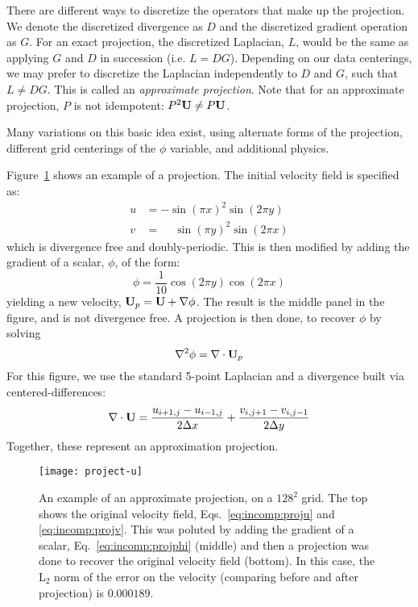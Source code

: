 There are different ways to discretize the operators that make up the
projection.  We denote the discretized divergence as $D$ and the
discretized gradient operation as $G$.  For an exact projection, the
discretized Laplacian, $L$, would be the same as applying $G$ and $D$
in succession (i.e. $L = DG$).  Depending on our data centerings, we
may prefer to discretize the Laplacian independently to $D$ and $G$,
such that $L \ne DG$.  This is called an {\em approximate projection}.
Note that for an approximate projection, $P$ is not
idempotent: $P^2 {\bf U} \ne P{\bf U}$.

Many variations on this basic idea exist, using alternate forms of the
projection, different grid centerings of the $\phi$ variable, and
additional physics.

Figure~\ref{fig:incomp:project} shows an example of a projection.  The
initial velocity field is specified as:
\begin{align}
\label{eq:incomp:proju}
  u &= -\sin(\pi x)^2 \sin(2\pi y) \\
\label{eq:incomp:projv}
  v &= \phantom{+} \sin(\pi y)^2 \sin(2\pi x)
\end{align}
which is divergence free and doubly-periodic.  This is then modified
by adding the gradient of a scalar, $\phi$, of the form:
\begin{equation}
\label{eq:incomp:projphi}
\phi = \frac{1}{10} \cos(2\pi y) \cos(2\pi x) 
\end{equation}
yielding a new velocity, ${\bf U}_p = {\bf U} + \nabla \phi$.
The result is the middle panel in the figure, and is not divergence free.
A projection is then done, to recover $\phi$ by solving
\begin{equation}
\nabla^2 \phi = \nabla \cdot {\bf U}_p
\end{equation}
For this figure, we use the standard 5-point Laplacian and a divergence
built via centered-differences:
\begin{equation}
\nabla \cdot {\bf U} = \frac{u_{i+1,j} - u_{i-1,j}}{2\Delta x} + \frac{v_{i,j+1} - v_{i,j-1}}{2\Delta y}
\end{equation}
Together, these represent an approximation projection. 

\begin{figure}[t]
\centering
\texttt{[image: project-u]}
\caption[Example of a projection]{\label{fig:incomp:project} An
  example of an approximate projection, on a $128^2$ grid.  The top
  shows the original velocity field, Eqs.~\ref{eq:incomp:proju} and
  \ref{eq:incomp:projv}.  This was poluted by adding the gradient of a
  scalar, Eq.~\ref{eq:incomp:projphi} (middle) and then a projection
  was done to recover the original velocity field (bottom).  In this
  case, the L$_2$ norm of the error on the velocity (comparing before
  and after projection) is $0.000189$. }
\end{figure}

